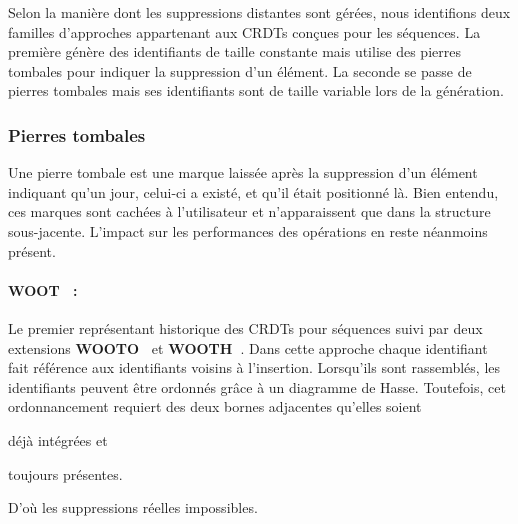 
Selon la manière dont les suppressions distantes sont gérées, nous identifions
deux familles d'approches appartenant aux CRDTs conçues pour les séquences. La
première génère des identifiants de taille constante mais utilise des pierres
tombales pour indiquer la suppression d'un élément. La seconde se passe de
pierres tombales mais ses identifiants sont de taille variable lors de la
génération.

\subsubsection{Pierres tombales}

Une pierre tombale est une marque laissée après la suppression d'un élément
indiquant qu'un jour, celui-ci a existé, et qu'il était positionné là. Bien
entendu, ces marques sont cachées à l'utilisateur et n'apparaissent que dans la
structure sous-jacente. L'impact sur les performances des opérations en reste
néanmoins présent.

\paragraph{WOOT~\cite{oster2006data} :} Le premier représentant historique des
CRDTs pour séquences suivi par deux extensions
\textbf{WOOTO~\cite{weiss2007wooki}} et
\textbf{WOOTH~\cite{ahmed2011evaluating}}. Dans cette approche chaque
identifiant fait référence aux identifiants voisins à l'insertion.  Lorsqu'ils
sont rassemblés, les identifiants peuvent être ordonnés grâce à un diagramme de
Hasse. Toutefois, cet ordonnancement requiert des deux bornes adjacentes
qu'elles soient
\begin{inparaenum}[(i)]
\item déjà intégrées et
\item toujours présentes.
\end{inparaenum}
D'où les suppressions réelles impossibles.

